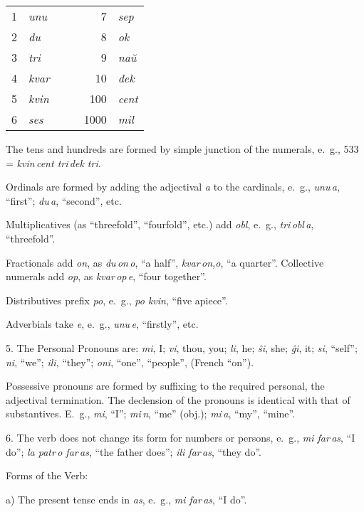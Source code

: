 \documentclass[12pt,twoside]{book}
\begin{document}
\begin{center}
\begin{tabular}{rlccrl}
1 & \emph{unu} & \hspace{2em} & \hspace{2em} & 7 & \emph{sep} \\
2 & \emph{du} & & & 8 & \emph{ok} \\
3 & \emph{tri} & & & 9 & \emph{naŭ} \\
4 & \emph{kvar} & & & 10 & \emph{dek} \\
5 & \emph{kvin} & & & 100 & \emph{cent} \\
6 & \emph{ses} & & & 1000 & \emph{mil} 
\end{tabular}
\end{center}

The tens and hundreds are formed by simple junction of the numerals, e.~g., 533 = \emph{kvin\,cent tri\,dek tri}.

Ordinals are formed by adding the adjectival \emph{a} to the cardinals, e.~g., \emph{unu\,a}, “first”; \emph{du\,a}, “second”, etc.

Multiplicatives (as “threefold”, “fourfold”, etc.) add \emph{obl}, e.~g., \emph{tri\,obl\,a}, “threefold”.

Fractionals add \emph{on}, as \emph{du\,on\,o}, “a half”, \emph{kvar\,on,o}, “a quarter”. Collective numerals add \emph{op}, as \emph{kvar\,op\,e}, “four together”.

Distributives prefix \emph{po}, e.~g., \emph{po kvin}, “five apiece”.

Adverbials take \emph{e}, e.~g., \emph{unu\,e}, “firstly”, etc.

5. The Personal Pronouns are: \emph{mi}, I; \emph{vi}, thou, you; \emph{li}, he; \emph{ŝi}, she; \emph{ĝi}, it; \emph{si}, “self”; \emph{ni}, “we”; \emph{ili}, “they”; \emph{oni}, “one”, “people”, (French “on”).

Possessive pronouns are formed by suffixing to the required personal, the adjectival termination. The declension of the pronouns is identical with that of substantives. E.~g., \emph{mi}, “I”; \emph{mi\,n}, “me” (obj.); \emph{mi\,a}, “my”, “mine”.

6. The verb does not change its form for numbers or persons, e.~g., \emph{mi far\,as}, “I do”; \emph{la patr\,o far\,as}, “the father does”; \emph{ili far\,as}, “they do”.

Forms of the Verb:

a) The present tense ends in \emph{as}, e.~g., \emph{mi far\,as}, “I do”.
\end{document}
